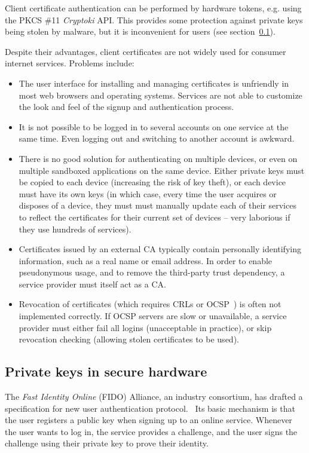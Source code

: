 Client certificate authentication can be performed by hardware tokens, e.g. using the PKCS \#11
\emph{Cryptoki} API. This provides some protection against private keys being stolen by malware, but
it is inconvenient for users (see section~\ref{sec:hardware}).

Despite their advantages, client certificates are not widely used for consumer internet services.
Problems include:
\begin{itemize}
\item The user interface for installing and managing certificates is unfriendly in most web
browsers and operating systems. Services are not able to customize the look and feel of the signup
and authentication process.
\item It is not possible to be logged in to several accounts on one service at the same time. Even
logging out and switching to another account is awkward.
\item There is no good solution for authenticating on multiple devices, or even on multiple
sandboxed applications on the same device. Either private keys must be copied to each device
(increasing the risk of key theft), or each device must have its own keys (in which case, every time
the user acquires or disposes of a device, they must must manually update each of their services to
reflect the certificates for their current set of devices -- very laborious if they use hundreds of
services).
\item Certificates issued by an external CA typically contain personally identifying information,
such as a real name or email address. In order to enable pseudonymous usage, and to remove the
third-party trust dependency, a service provider must itself act as a CA.
\item Revocation of certificates (which requires CRLs or OCSP~\cite{OCSP}) is often not implemented
correctly. If OCSP servers are slow or unavailable, a service provider must either fail all logins
(unacceptable in practice), or skip revocation checking (allowing stolen certificates to be used).
\end{itemize}

\subsection{Private keys in secure hardware}\label{sec:hardware}

The \emph{Fast Identity Online} (FIDO) Alliance, an industry consortium, has drafted a specification
for new user authentication protocol.~\cite{FIDOOverview, FIDOSpec} Its basic mechanism is that the
user registers a public key when signing up to an online service. Whenever the user wants to log in,
the service provides a challenge, and the user signs the challenge using their private key to prove
their identity.

